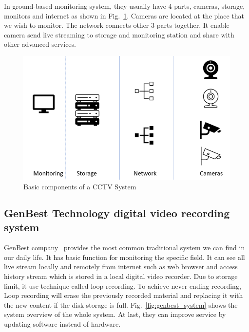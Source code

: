 In ground-based monitoring system, they usually have 4 parts, cameras, storage, monitors and internet as shown in Fig.~\ref{fig:cctv_system}. Cameras are located at the place that we wish to monitor. The network connects other 3 parts together. It enable camera send live streaming to storage and monitoring station and share with other advanced services.

\begin{figure}[H]
    \centering
    \includegraphics[width=\textwidth]{figsrc/cctv_system.png}
    \caption{Basic components of a CCTV System\label{fig:cctv_system}}
\end{figure}

\subsection{GenBest Technology digital video recording system}
GenBest company~\cite{genbest-LTD} provides the most common traditional system we can find in our daily life. It has basic function for monitoring the specific field. It can see all live stream locally and remotely from internet such as web browser and access history stream which is stored in a local digital video recorder. Due to storage limit, it use technique called loop recording. To achieve never-ending recording, Loop recording will erase the previously recorded material and replacing it with the new content if the disk storage is full. Fig.~\ref{fig:genbest_system} shows the system overview of the whole system. At last, they can improve service by updating software instead of hardware.


